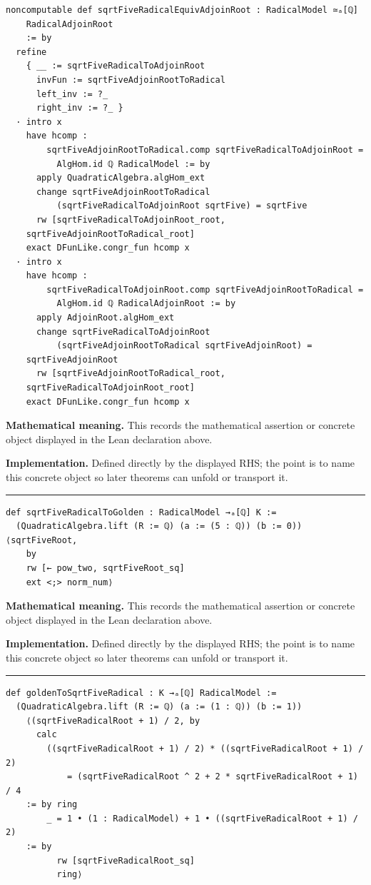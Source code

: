 \documentclass[UTF8,a4paper,11pt,fontset=fandol]{ctexart}
\theoremstyle{definition}
\newcommand{\statementsep}{\par\medskip\hrule\medskip}
\begin{document}
\begin{verbatim}
noncomputable def sqrtFiveRadicalEquivAdjoinRoot : RadicalModel ≃ₐ[ℚ]
    RadicalAdjoinRoot
    := by
  refine
    { __ := sqrtFiveRadicalToAdjoinRoot
      invFun := sqrtFiveAdjoinRootToRadical
      left_inv := ?_
      right_inv := ?_ }
  · intro x
    have hcomp :
        sqrtFiveAdjoinRootToRadical.comp sqrtFiveRadicalToAdjoinRoot =
          AlgHom.id ℚ RadicalModel := by
      apply QuadraticAlgebra.algHom_ext
      change sqrtFiveAdjoinRootToRadical
          (sqrtFiveRadicalToAdjoinRoot sqrtFive) = sqrtFive
      rw [sqrtFiveRadicalToAdjoinRoot_root,
    sqrtFiveAdjoinRootToRadical_root]
    exact DFunLike.congr_fun hcomp x
  · intro x
    have hcomp :
        sqrtFiveRadicalToAdjoinRoot.comp sqrtFiveAdjoinRootToRadical =
          AlgHom.id ℚ RadicalAdjoinRoot := by
      apply AdjoinRoot.algHom_ext
      change sqrtFiveRadicalToAdjoinRoot
          (sqrtFiveAdjoinRootToRadical sqrtFiveAdjoinRoot) =
    sqrtFiveAdjoinRoot
      rw [sqrtFiveAdjoinRootToRadical_root,
    sqrtFiveRadicalToAdjoinRoot_root]
    exact DFunLike.congr_fun hcomp x
\end{verbatim}
\noindent\textbf{Mathematical meaning.} This records the mathematical assertion or concrete object displayed in the Lean declaration above.\par
\noindent\textbf{Implementation.} Defined directly by the displayed RHS; the point is to name this concrete object so later theorems can unfold or transport it.\par
\statementsep
\begin{verbatim}
def sqrtFiveRadicalToGolden : RadicalModel →ₐ[ℚ] K :=
  (QuadraticAlgebra.lift (R := ℚ) (a := (5 : ℚ)) (b := 0)) ⟨sqrtFiveRoot,
    by
    rw [← pow_two, sqrtFiveRoot_sq]
    ext <;> norm_num⟩
\end{verbatim}
\noindent\textbf{Mathematical meaning.} This records the mathematical assertion or concrete object displayed in the Lean declaration above.\par
\noindent\textbf{Implementation.} Defined directly by the displayed RHS; the point is to name this concrete object so later theorems can unfold or transport it.\par
\statementsep
\begin{verbatim}
def goldenToSqrtFiveRadical : K →ₐ[ℚ] RadicalModel :=
  (QuadraticAlgebra.lift (R := ℚ) (a := (1 : ℚ)) (b := 1))
    ⟨(sqrtFiveRadicalRoot + 1) / 2, by
      calc
        ((sqrtFiveRadicalRoot + 1) / 2) * ((sqrtFiveRadicalRoot + 1) / 2)
            = (sqrtFiveRadicalRoot ^ 2 + 2 * sqrtFiveRadicalRoot + 1) / 4
    := by ring
        _ = 1 • (1 : RadicalModel) + 1 • ((sqrtFiveRadicalRoot + 1) / 2)
    := by
          rw [sqrtFiveRadicalRoot_sq]
          ring⟩
\end{verbatim}
\end{document}
